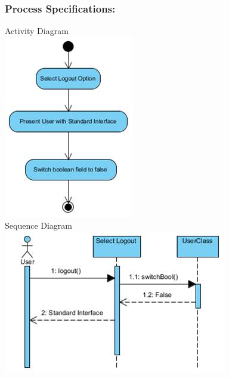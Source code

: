 \documentclass[a4paper,11pt]{article}
\begin{document}
\subsubsection{Process Specifications:} 
Activity Diagram\\
\includegraphics[width=1\linewidth]{./Images/CRUDThread/Diagrams/19.jpg}\\
Sequence Diagram\\
\includegraphics[width=1\linewidth]{./Images/CRUDThread/Diagrams/20.jpg}\\
\end{document}
